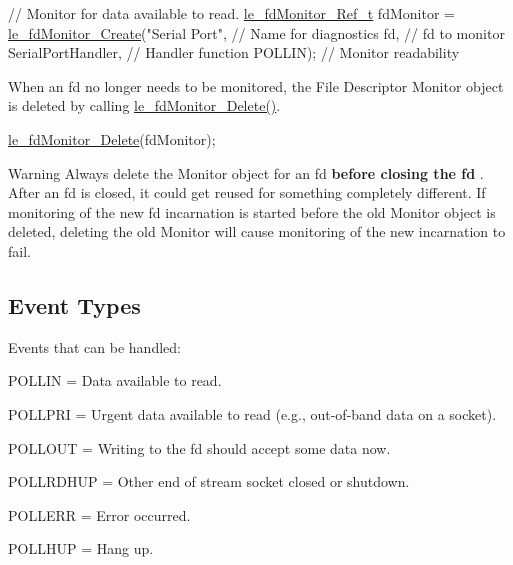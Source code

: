 \begin{DoxyCode}
\textcolor{comment}{// Monitor for data available to read.}
\hyperlink{le__fd_monitor_8h_a85048556f0b95147af81e76907895d42}{le\_fdMonitor\_Ref\_t} fdMonitor = \hyperlink{le__fd_monitor_8h_a52902d634d810f9b7a23c53c9c5164f0}{le\_fdMonitor\_Create}(\textcolor{stringliteral}{"Serial Port"},     
       \textcolor{comment}{// Name for diagnostics}
                                                   fd,                 \textcolor{comment}{// fd to monitor}
                                                   SerialPortHandler,  \textcolor{comment}{// Handler function}
                                                   POLLIN);            \textcolor{comment}{// Monitor readability}
\end{DoxyCode}


When an fd no longer needs to be monitored, the File Descriptor Monitor object is deleted by calling \hyperlink{le__fd_monitor_8h_ad7f0f1a0cd2f99b081403784f048aef0}{le\+\_\+fd\+Monitor\+\_\+\+Delete()}.


\begin{DoxyCode}
\hyperlink{le__fd_monitor_8h_ad7f0f1a0cd2f99b081403784f048aef0}{le\_fdMonitor\_Delete}(fdMonitor);
\end{DoxyCode}


\begin{DoxyWarning}{Warning}
Always delete the Monitor object for an fd {\bfseries  before closing the fd }. After an fd is closed, it could get reused for something completely different. If monitoring of the new fd incarnation is started before the old Monitor object is deleted, deleting the old Monitor will cause monitoring of the new incarnation to fail.
\end{DoxyWarning}
\hypertarget{c_fd_monitor_c_fdMonitorEvents}{}\subsection{Event Types}\label{c_fd_monitor_c_fdMonitorEvents}
Events that can be handled\+:


\begin{DoxyItemize}
\item {\ttfamily P\+O\+L\+L\+I\+N} = Data available to read.
\item {\ttfamily P\+O\+L\+L\+P\+R\+I} = Urgent data available to read (e.\+g., out-\/of-\/band data on a socket).
\item {\ttfamily P\+O\+L\+L\+O\+U\+T} = Writing to the fd should accept some data now.
\item {\ttfamily P\+O\+L\+L\+R\+D\+H\+U\+P} = Other end of stream socket closed or shutdown.
\item {\ttfamily P\+O\+L\+L\+E\+R\+R} = Error occurred.
\item {\ttfamily P\+O\+L\+L\+H\+U\+P} = Hang up.
\end{DoxyItemize}

